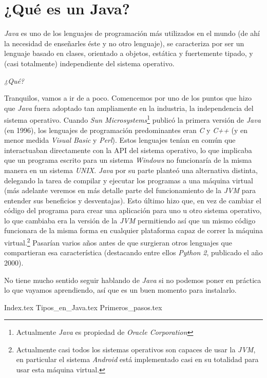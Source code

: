 \chapter{¿Qué es un Java?}
    \label{ch:java}
    \textit{Java} es uno de los lenguajes de programación más utilizados en el mundo (de ahí la 
    necesidad de enseñarles éste y no otro lenguaje), se caracteriza por ser un lenguaje basado en 
    clases, orientado a objetos, estática y fuertemente tipado, y (casi totalmente) independiente del sistema 
    operativo.
    
    \begin{center}
      \textit{¿Qué?}
    \end{center}

    Tranquilos, vamos a ir de a poco.
    Comencemos por uno de los puntos que hizo que \textit{Java} fuera adoptado tan ampliamente en la
    industria, la independencia del sistema operativo.
    Cuando \textit{Sun Microsystems}\footnote{Actualmente \textit{Java} es propiedad de 
    \textit{Oracle Corporation}} publicó la primera versión de \textit{Java} (en 1996), los 
    lenguajes de programación predominantes eran \textit{C} y \textit{C++} (y en menor medida 
    \textit{Visual Basic} y \textit{Perl}).
    Estos lenguajes tenían en común que interactuaban directamente con la API del sistema operativo,
    lo que implicaba que un programa escrito para un sistema \textit{Windows} no funcionaría de la
    misma manera en un sistema \textit{UNIX}.
    \textit{Java} por su parte planteó una alternativa distinta, delegando la tarea de compilar y 
    ejecutar los programas a una máquina virtual (más adelante veremos en más detalle parte del 
    funcionamiento de la \textit{JVM} para entender sus beneficios y desventajas).
    Esto último hizo que, en vez de cambiar el código del programa para crear una aplicación para 
    uno u otro sistema operativo, lo que cambiaba era la versión de la \textit{JVM} permitiendo así
    que un mismo código funcionara de la misma forma en cualquier plataforma capaz de correr la 
    máquina virtual.\footnote{Actualmente casi todos los sistemas operativos son capaces de usar la 
    \textit{JVM}, en particular el sistema \textit{Android} está implementado casi en su totalidad 
    para usar esta máquina virtual.}
    Pasarían varios años antes de que surgieran otros lenguajes que compartieran esa característica
    (destacando entre ellos \textit{Python 2}, publicado el año 2000).

    No tiene mucho sentido seguir hablando de \textit{Java} si no podemos poner en práctica lo que 
    vayamos aprendiendo, así que es un buen momento para instalarlo.
    
    {Index.tex}
    {Tipos_en_Java.tex}
    {Primeros_pasos.tex}
  
  \printbibliography[keyword=Java]